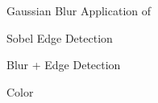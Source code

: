 \documentclass{beamer}
\begin{document}
\begin{frame}{Gaussian Blur}
Application of 

\end{frame}

\begin{frame}{Sobel Edge Detection}

\end {frame}

\begin{frame}{Blur + Edge Detection}

\end{frame}


\begin{frame}{Color}

\end{frame}
\end{document}
